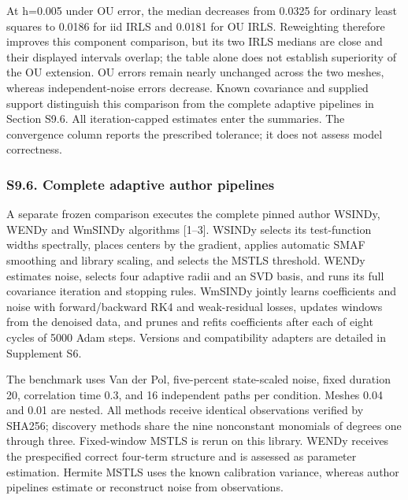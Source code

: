 \documentclass[
  american,
  11pt,
]{article}
\begin{document}
At h=0.005 under OU error, the median decreases from 0.0325 for ordinary
least squares to 0.0186 for iid IRLS and 0.0181 for OU IRLS. Reweighting
therefore improves this component comparison, but its two IRLS medians
are close and their displayed intervals overlap; the table alone does
not establish superiority of the OU extension. OU errors remain nearly
unchanged across the two meshes, whereas independent-noise errors
decrease. Known covariance and supplied support distinguish this
comparison from the complete adaptive pipelines in Section S9.6. All
iteration-capped estimates enter the summaries. The convergence column
reports the prescribed tolerance; it does not assess model correctness.

\subsubsection{S9.6. Complete adaptive author
pipelines}\label{s9.6.-complete-adaptive-author-pipelines}

A separate frozen comparison executes the complete pinned author WSINDy,
WENDy and WmSINDy algorithms {[}1--3{]}. WSINDy selects its
test-function widths spectrally, places centers by the gradient, applies
automatic SMAF smoothing and library scaling, and selects the MSTLS
threshold. WENDy estimates noise, selects four adaptive radii and an SVD
basis, and runs its full covariance iteration and stopping rules.
WmSINDy jointly learns coefficients and noise with forward/backward RK4
and weak-residual losses, updates windows from the denoised data, and
prunes and refits coefficients after each of eight cycles of 5000 Adam
steps. Versions and compatibility adapters are detailed in Supplement
S6.

The benchmark uses Van der Pol, five-percent state-scaled noise, fixed
duration 20, correlation time 0.3, and 16 independent paths per
condition. Meshes 0.04 and 0.01 are nested. All methods receive
identical observations verified by SHA256; discovery methods share the
nine nonconstant monomials of degrees one through three. Fixed-window
MSTLS is rerun on this library. WENDy receives the prespecified correct
four-term structure and is assessed as parameter estimation. Hermite
MSTLS uses the known calibration variance, whereas author pipelines
estimate or reconstruct noise from observations.
\end{document}
